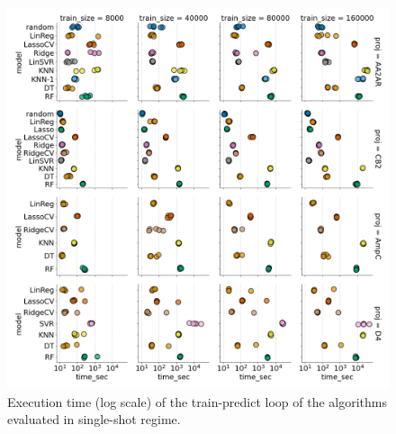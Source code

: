 \begin{table}[!ht]
    \centering
    \begin{adjustbox}{angle=90}
        \resizebox{1.2\textwidth}{!}
        {
            
        }
    \end{adjustbox}
\end{table}

\begin{figure}[ht]
\centering
\includegraphics[width=1.0\textwidth]{figures/Supp_Figure_1_execution_time.png}
\caption{Execution time (log scale) of the train-predict loop of the algorithms evaluated in single-shot regime.}
\label{fig:supp_fig_1_execution_time}
\end{figure}
